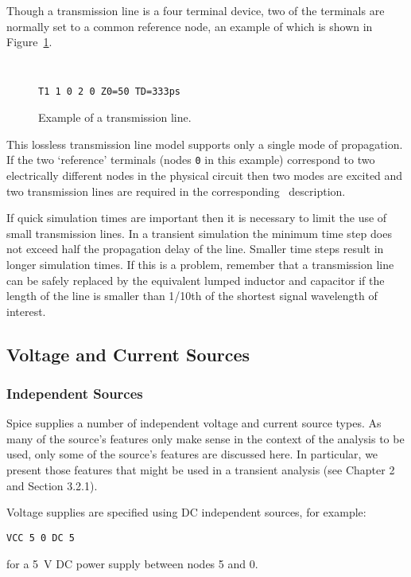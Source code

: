 Though a transmission line  is a four terminal device, two of the
terminals are normally set to a common reference node, an example
of which is shown in Figure~\ref{tl1}.
%
\begin{figure}
\centerline{}
\par\noindent
{\tt
\begin{verbatim}
T1 1 0 2 0 Z0=50 TD=333ps
\end{verbatim}
}
\caption{Example of a transmission line.}
\label{tl1}
\end{figure}
%
This lossless transmission line model supports only a single mode of
propagation.
If the two `reference' terminals (nodes {\tt 0} in this example)
correspond to two electrically different nodes in the
physical circuit then two modes are excited and two transmission lines
are required in the corresponding \spice\ description.

If quick simulation times are important then it is necessary to limit
the use of small transmission lines.  In a transient simulation the
minimum time step does not exceed half the propagation delay of the line.
Smaller time steps result in longer simulation times.
If this is a problem, remember that a transmission line can be safely
replaced by the equivalent lumped inductor and capacitor if the length
of the line is smaller than 1/10th of the shortest signal wavelength of
interest.

\subsection{Voltage and Current Sources}

\subsubsection{Independent Sources}

Spice supplies a number of independent voltage and current source types.
As many of the source's features only make sense in the context
of the analysis to be used, only some of the source's features
are discussed here.  In particular, we present those features that
might be used in a transient analysis (see Chapter 2 and Section 3.2.1).

Voltage supplies are specified using DC independent sources, for
example:
\par\noindent
\begin{center}
{\tt VCC 5 0 DC 5}
\end{center}
\par\noindent
for a 5~V DC power supply between nodes 5 and 0.

